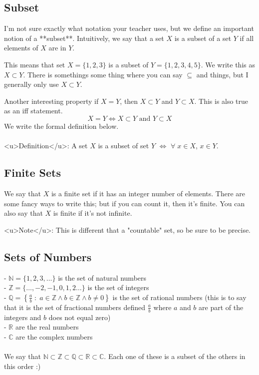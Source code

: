 \subsection{Subset}

I'm not sure exactly what notation your teacher uses, but we define an important notion of a **subset**. Intuitively, we say that a set $X$ is a subset of a set $Y$ if all elements of $X$ are in $Y$. 

This means that set $X = \{1,2,3\}$ is a subset of $Y = \{1,2,3,4,5\}$. We write this as $X \subset Y$. There is somethings some thing where you can say $\subseteq$ and things, but I generally only use $X \subset Y$. 

Another interesting property if $X = Y$, then $X \subset Y$ and $Y \subset X$. This is also true as an iff statement.
$$
X = Y \iff X \subset Y \text{ and } Y \subset X
$$
We write the formal definition below.\\
\\
<u>Definition</u>: A set $X$ is a subset of set $Y$ $\iff$ $\forall \;x\in X$, $x \in Y$.  

\subsection{Finite Sets}

We say that $X$ is a finite set if it has an integer number of elements. There are some fancy ways to write this; but if you can count it, then it's finite. You can also say that $X$ is finite if it's not infinite.

<u>Note</u>: This is different that a "countable" set, so be sure to be precise.

\subsection{Sets of Numbers}
- $\mathbb{N} = \{1,2,3,\dots\}$ is the set of natural numbers \\
- $\mathbb{Z} = \{\dots,-2,-1,0,1,2\dots\}$ is the set of integers\\
- $\mathbb{Q} = \left\{\frac{a}{b}\;:\; a \in \mathbb{Z} \wedge b \in \mathbb{Z} \wedge b \neq 0\right\}$ is the set of rational numbers (this is to say that it is the set of fractional numbers defined $\frac{a}{b}$ where $a$ and $b$ are part of the integers and $b$ does not equal zero)\\
- $\mathbb{R}$ are the real numbers\\
- $\mathbb{C}$ are the complex numbers\\
\\
We say that $\mathbb{N} \subset \mathbb{Z} \subset \mathbb{Q} \subset \mathbb{R} \subset \mathbb{C}$. Each one of these is a subset of the others in this order :)

